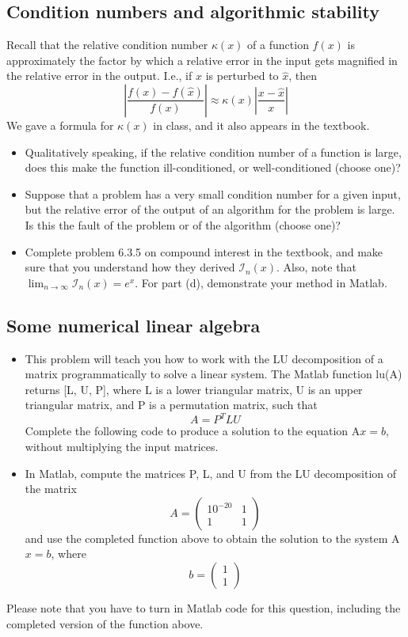 \documentclass{article}
\begin{document}
\subsection{Condition numbers and algorithmic stability}
Recall that the relative condition number $\kappa(x)$ of a function $f(x)$ is approximately the factor by which a relative error in the input gets magnified in the relative error in the output. I.e., if $x$ is perturbed to $\hat{x}$, then
\[\left|\frac{f(x)-f(\hat{x})}{f(x)}\right|\approx\kappa(x)\left|\frac{x - \hat{x}}{x}\right|\]
We gave a formula for $\kappa(x)$ in class, and it also appears in the textbook.
\begin{itemize}
    \item Qualitatively speaking, if the relative condition number of a function is large, does this make the function ill-conditioned, or well-conditioned (choose one)?
    \item Suppose that a problem has a very small condition number for a given input, but the relative error of the output of an algorithm for the problem is large. Is this the fault of the problem or of the algorithm (choose one)?
    \item Complete problem 6.3.5 on compound interest in the textbook, and make sure that you understand how they derived $\mathcal{I}_n(x)$. Also, note that\newline $\lim_{n\to\infty} \mathcal{I}_n(x) = e^x$. \newline\newline
    For part (d), demonstrate your method in Matlab.
\end{itemize}

\subsection{Some numerical linear algebra}
\begin{itemize}
    \item This problem will teach you how to work with the LU decomposition of a matrix programmatically to solve a linear system. The Matlab function lu(A) returns [L, U, P], where L is a lower triangular matrix, U is an upper triangular matrix, and P is a permutation matrix, such that
    \[A = P^TLU\]
    Complete the following code to produce a solution to the equation A$x = b$, without multiplying the input matrices.
    \item In Matlab, compute the matrices P, L, and U from the LU decomposition of the matrix
    \[A = \begin{pmatrix}10^{-20} & 1 \\ 1 & 1 \end{pmatrix}\]
    and use the completed function above to obtain the solution to the system A$x = b$, where
    \[b = \begin{pmatrix}1 \\ 1 \end{pmatrix}\]
\end{itemize}
Please note that you have to turn in Matlab code for this question, including the completed version
of the function above.
\end{document}

